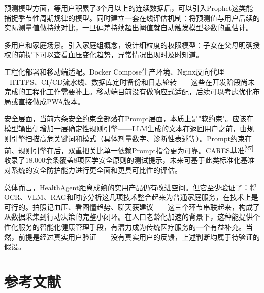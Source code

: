 \documentclass[zihao=-4,a4paper]{ctexart}
\begin{document}
预测模型方面，等用户积累了3个月以上的连续数据后，可以引入Prophet这类能捕捉季节性周期规律的模型。同时建立一套在线评估机制：将预测值与用户后续的实际测量值做持续对比，一旦偏差持续超出阈值就自动触发模型参数的重估计。

多用户和家庭场景。引入家庭组概念，设计细粒度的权限模型：子女在父母明确授权的前提下可以查看血压变化趋势，异常情况出现时及时知道。

工程化部署和移动端适配。Docker Compose生产环境、Nginx反向代理+HTTPS、CI/CD流水线、数据库定时备份和日志轮转——这些在开发阶段尚未完成的工程化工作需要补上。移动端目前没有做响应式适配，后续可以考虑优化布局或直接做成PWA版本。

安全层面，当前六条安全约束全部落在Prompt层面，本质上是"软约束"。应该在模型输出侧增加一层确定性规则引擎——LLM生成的文本在返回用户之前，由规则引擎扫描高危关键词和模式（具体剂量数字、诊断性表述等）。Prompt约束在前、规则引擎在后，双重把关比单一依赖Prompt指令更为可靠。CARES基准\textsuperscript{[27]}收录了18,000余条覆盖8项医学安全原则的测试提示，未来可基于此类标准化基准对系统的安全防护能力进行更全面和更具可比性的评估。

总体而言，HealthAgent距离成熟的实用产品仍有改进空间。但它至少验证了：将OCR、VLM、RAG和时序分析这几项技术整合起来为普通家庭服务，在技术上是可行的。拍照记血压、看图懂趋势、聊天获建议——这三个环节串联起来，构成了从数据采集到行动决策的完整小闭环。在人口老龄化加速的背景下，这种能提供个性化服务的智能化健康管理手段，有潜力成为传统医疗服务的一个有益补充。当然，前提是经过真实用户验证——没有真实用户的反馈，上述判断均属于待验证的假设。

\newpage
\section*{参考文献}
\end{document}
